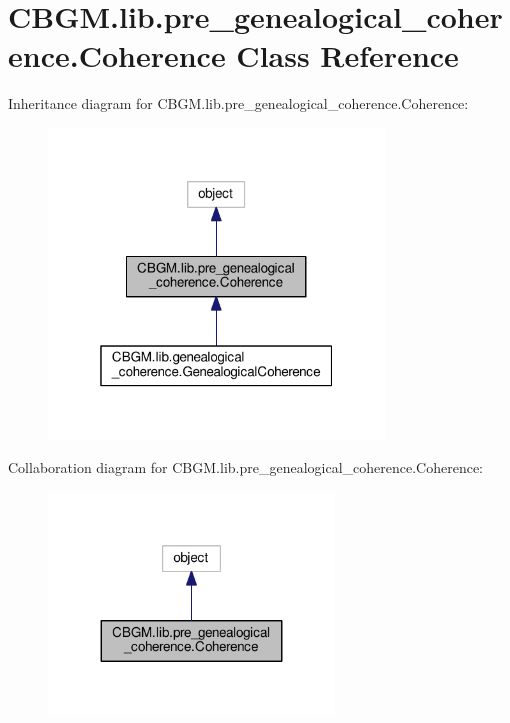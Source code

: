 \hypertarget{classCBGM_1_1lib_1_1pre__genealogical__coherence_1_1Coherence}{}\section{C\+B\+G\+M.\+lib.\+pre\+\_\+genealogical\+\_\+coherence.\+Coherence Class Reference}
\label{classCBGM_1_1lib_1_1pre__genealogical__coherence_1_1Coherence}


Inheritance diagram for C\+B\+G\+M.\+lib.\+pre\+\_\+genealogical\+\_\+coherence.\+Coherence\+:\nopagebreak
\begin{figure}[H]
\begin{center}
\leavevmode
\includegraphics[width=253pt]{classCBGM_1_1lib_1_1pre__genealogical__coherence_1_1Coherence__inherit__graph}
\end{center}
\end{figure}


Collaboration diagram for C\+B\+G\+M.\+lib.\+pre\+\_\+genealogical\+\_\+coherence.\+Coherence\+:\nopagebreak
\begin{figure}[H]
\begin{center}
\leavevmode
\includegraphics[width=215pt]{classCBGM_1_1lib_1_1pre__genealogical__coherence_1_1Coherence__coll__graph}
\end{center}
\end{figure}
